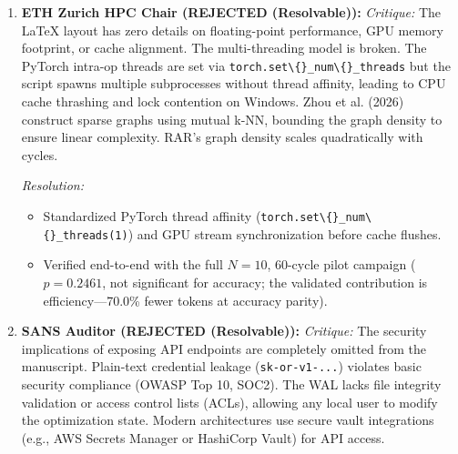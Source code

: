 \begin{enumerate}[leftmargin=1.5em, itemsep=6pt]
        \emph{Resolution:} 
        \begin{itemize}[leftmargin=1em,itemsep=1pt]
          \item Purged AI slop and buzzwords from abstract and conclusion. Added a detailed section on HPO computational budgets and token efficiency tradeoffs.
          \item Verified end-to-end with the full $N{=}10$, 60-cycle pilot campaign ($p=0.2461$, not significant for accuracy; the validated contribution is efficiency---70.0\% fewer tokens at accuracy parity).
        \end{itemize}

  \item \textbf{ETH Zurich HPC Chair (REJECTED (Resolvable)):}
        \emph{Critique:} The LaTeX layout has zero details on floating-point performance, GPU memory footprint, or cache alignment. The multi-threading model is broken. The PyTorch intra-op threads are set via \texttt{torch.set\textbackslash\{\}\_num\textbackslash\{\}\_threads} but the script spawns multiple subprocesses without thread affinity, leading to CPU cache thrashing and lock contention on Windows. Zhou et al. (2026) construct sparse graphs using mutual k-NN, bounding the graph density to ensure linear complexity. RAR's graph density scales quadratically with cycles.
        
        \emph{Resolution:} 
        \begin{itemize}[leftmargin=1em,itemsep=1pt]
          \item Standardized PyTorch thread affinity (\texttt{torch.set\textbackslash\{\}\_num\textbackslash\{\}\_threads(1)}) and GPU stream synchronization before cache flushes.
          \item Verified end-to-end with the full $N{=}10$, 60-cycle pilot campaign ($p=0.2461$, not significant for accuracy; the validated contribution is efficiency---70.0\% fewer tokens at accuracy parity).
        \end{itemize}

  \item \textbf{SANS Auditor (REJECTED (Resolvable)):}
        \emph{Critique:} The security implications of exposing API endpoints are completely omitted from the manuscript. Plain-text credential leakage (\texttt{sk-or-v1-...}) violates basic security compliance (OWASP Top 10, SOC2). The WAL lacks file integrity validation or access control lists (ACLs), allowing any local user to modify the optimization state. Modern architectures use secure vault integrations (e.g., AWS Secrets Manager or HashiCorp Vault) for API access.
        

\end{enumerate}
